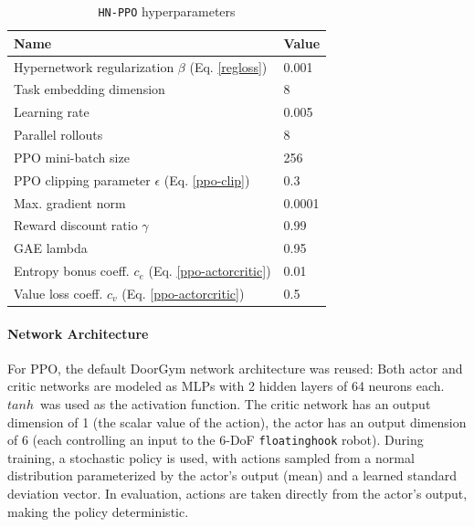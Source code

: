\documentclass[dvipsnames]{article} %
\begin{document}
\begin{table}[htbp]
\caption{\texttt{HN-PPO} hyperparameters}
\label{tab:hnppo-hparams}
\begin{center}
\begin{tabular}{@{}ll@{}}
\toprule
Name & Value \\ 
\midrule
Hypernetwork regularization $\beta$ (Eq. \ref{regloss})& 0.001 \\
Task embedding dimension & 8 \\
Learning rate & 0.005 \\
Parallel rollouts & 8 \\
PPO mini-batch size & 256 \\
PPO clipping parameter $\epsilon$ (Eq. \ref{ppo-clip}) & 0.3 \\
Max. gradient norm & 0.0001 \\
Reward discount ratio $\gamma$ & 0.99\\
GAE lambda & 0.95\\
Entropy bonus coeff. $c_e$ (Eq. \ref{ppo-actorcritic}) & 0.01\\
Value loss coeff. $c_v$ (Eq. \ref{ppo-actorcritic}) &  0.5\\
\bottomrule
\end{tabular}
\end{center}
\end{table}


\paragraph{Network Architecture}
\label{chap:architecture}
For PPO, the default DoorGym network architecture was reused: Both actor and critic networks are modeled as MLPs with 2 hidden layers of 64 neurons each. $tanh$~was used as the activation function. The critic network has an output dimension of 1 (the scalar value of the action), the actor has an output dimension of 6 (each controlling an input to the 6-DoF \texttt{floatinghook} robot). During training, a stochastic policy is used, with actions sampled from a normal distribution parameterized by the actor's output (mean) and a learned standard deviation vector. In evaluation, actions are taken directly from the actor's output, making the policy deterministic.
\end{document}
